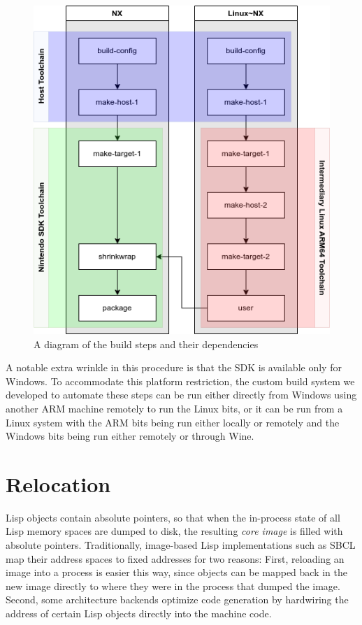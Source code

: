 \documentclass[format=sigconf]{acmart}
\begin{document}
\begin{figure}[h]
  \centering
  \includegraphics[width=\linewidth]{build.png}
  \caption{A diagram of the build steps and their dependencies}
\end{figure}

A notable extra wrinkle in this procedure is that the SDK is available only for Windows. To accommodate this platform restriction, the custom build system we developed to automate these steps can be run either directly from Windows using another ARM machine remotely to run the Linux bits, or it can be run from a Linux system with the ARM bits being run either locally or remotely and the Windows bits being run either remotely or through Wine\cite{amstadt1994wine}.

\section{Relocation}\label{relocation}
Lisp objects contain absolute pointers, so that when the in-process state of all Lisp memory spaces are dumped to disk, the resulting \textit{core image} is filled with absolute pointers. Traditionally, image-based Lisp implementations such as SBCL map their address spaces to fixed addresses for two reasons: First, reloading an image into a process is easier this way, since objects can be mapped back in the new image directly to where they were in the process that dumped the image. Second, some architecture backends optimize code generation by hardwiring the address of certain Lisp objects directly into the machine code.
\end{document}
